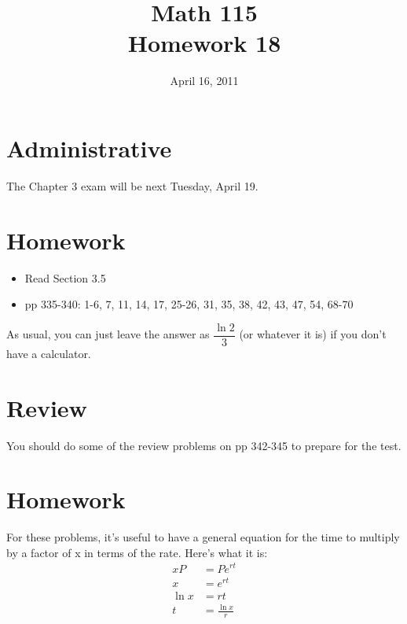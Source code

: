 \documentclass[fleqn,addpoints]{exam}
\title{Math 115 \\ Homework 18}
\date{April 16, 2011}
\begin{document}
\maketitle


\section{Administrative}

The Chapter 3 exam will be next Tuesday, April 19.  

\section{Homework}

\begin{itemize}
  \item Read Section 3.5
  \item pp 335-340: 1-6, 7, 11, 14, 17, 25-26, 31, 35, 38, 42, 43, 47, 54, 68-70
\end{itemize}

As usual, you can just leave the answer as $\dfrac{\ln 2}{3}$ (or whatever it is) if you don't have a calculator.

\section{Review}

You should do some of the review problems on pp 342-345 to prepare for the test.

\ifprintanswers

\section{Homework}

For these problems, it's useful to have a general equation for the time to multiply by a factor of x in terms of the rate.  Here's what it is:
\begin{align*}
  xP &= P e^{rt} \\
  x &= e^{rt} \\
  \ln x &= rt \\
  t &= \frac{\ln x}{r} \\
\end{align*}
\end{document}
